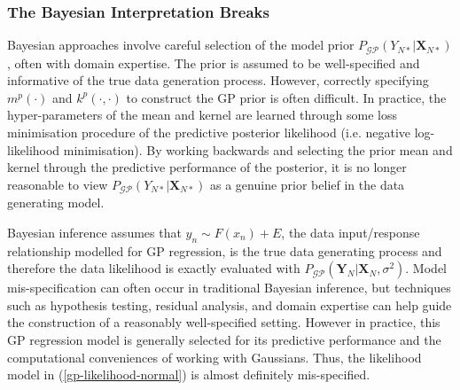 \documentclass{article}
\newcommand{\GP}{\operatorname{\mathcal{GP}}}
\numberwithin{equation}{section}
\begin{document}
\subsubsection{The Bayesian Interpretation Breaks}
Bayesian approaches involve careful selection of the model prior $P_{\GP}(Y_{N*}\vert \mathbf{X}_{N*})$, often with domain expertise. The prior is assumed to be well-specified and informative of the true data generation process. However, correctly specifying $m^p(\cdot)$ and $k^p(\cdot, \cdot)$ to construct the GP prior is often difficult. In practice, the hyper-parameters of the mean and kernel are learned through some loss minimisation procedure of the predictive posterior likelihood (i.e. negative log-likelihood minimisation). By working backwards and selecting the prior mean and kernel through the predictive performance of the posterior, it is no longer reasonable to view $P_{\GP}(Y_{N*}\vert \mathbf{X}_{N*})$ as a genuine prior belief in the data generating model.

 Bayesian inference assumes that $y_n \sim F(x_n) + E$, the data input/response relationship modelled for GP regression, is the true data generating process and therefore the data likelihood is exactly evaluated with $P_{\GP}\left(\mathbf{Y}_N \vert \mathbf{X}_N, \sigma^2\right)$. Model mis-specification can often occur in traditional Bayesian inference, but techniques such as hypothesis testing, residual analysis, and domain expertise can help guide the construction of a reasonably well-specified setting. However in practice, this GP regression model is generally selected for its predictive performance and the computational conveniences of working with Gaussians. Thus, the likelihood model in (\ref{gp-likelihood-normal}) is almost definitely mis-specified. 
 
\end{document}
